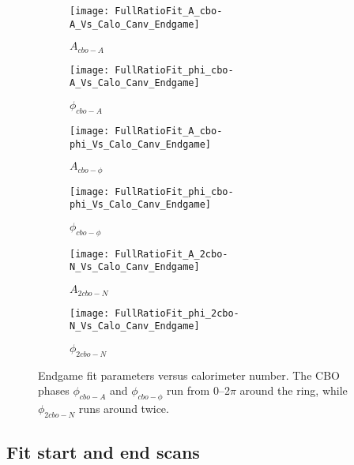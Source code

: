\begin{figure}[]
\centering
    \begin{subfigure}[]{0.45\textwidth}
        \centering
        \texttt{[image: FullRatioFit\_A\_cbo-A\_Vs\_Calo\_Canv\_Endgame]}
        \caption{$A_{cbo-A}$}
    \end{subfigure}%
    \begin{subfigure}[]{0.45\textwidth}
        \centering
        \texttt{[image: FullRatioFit\_phi\_cbo-A\_Vs\_Calo\_Canv\_Endgame]}
        \caption{$\phi_{cbo-A}$}
    \end{subfigure}

    \begin{subfigure}[]{0.45\textwidth}
        \centering
        \texttt{[image: FullRatioFit\_A\_cbo-phi\_Vs\_Calo\_Canv\_Endgame]}
        \caption{$A_{cbo-\phi}$}
    \end{subfigure}%
    \begin{subfigure}[]{0.45\textwidth}
        \centering
        \texttt{[image: FullRatioFit\_phi\_cbo-phi\_Vs\_Calo\_Canv\_Endgame]}
        \caption{$\phi_{cbo-\phi}$}
    \end{subfigure}

    \begin{subfigure}[]{0.45\textwidth}
        \centering
        \texttt{[image: FullRatioFit\_A\_2cbo-N\_Vs\_Calo\_Canv\_Endgame]}
        \caption{$A_{2cbo-N}$}
    \end{subfigure}%
    \begin{subfigure}[]{0.45\textwidth}
        \centering
        \texttt{[image: FullRatioFit\_phi\_2cbo-N\_Vs\_Calo\_Canv\_Endgame]}
        \caption{$\phi_{2cbo-N}$}
    \end{subfigure}
\caption[Endgame fit parameters versus calorimeter number]{Endgame fit parameters versus calorimeter number. The CBO phases $\phi_{cbo-A}$ and $\phi_{cbo-\phi}$ run from 0--2$\pi$ around the ring, while $\phi_{2cbo-N}$ runs around twice.}
\label{fig:fig:caloFits_EndgamePars_2}
\end{figure}




\subsection{Fit start and end scans}


